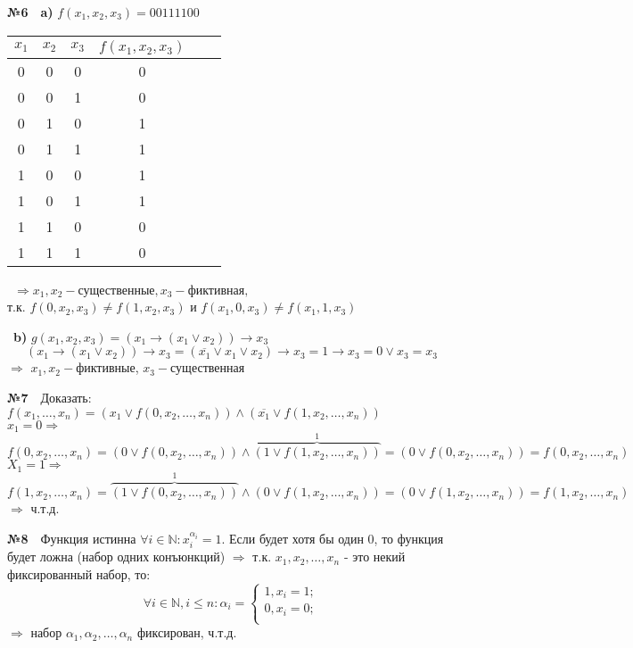\documentclass[a4paper, 12pt]{article}
\begin{document}
	\textbf{№6}\
	\
	\textbf{a)} $f(x_1,x_2, x_3) = 00111100$
	\begin{table}[H]
	\centering	
	\begin{tabular}{|c|c|c|c|c|c|}
		\hline
		$x_1$ & $x_2$ & $x_3$ & $f(x_1,x_2, x_3)$ \\ \hline
		0 & 0 & 0 & 0 \\ \hline
		0 & 0 & 1 & 0 \\ \hline
		0 & 1 & 0 & 1 \\ \hline
		0 & 1 & 1 & 1 \\ \hline	
		1 & 0 & 0 & 1 \\ \hline
		1 & 0 & 1 & 1 \\ \hline
		1 & 1 & 0 & 0 \\ \hline
		1 & 1 & 1 & 0 \\ \hline
	\end{tabular}
	\
	$\Rightarrow x_1, x_2 - \text{существенные}, x_3 - \text{фиктивная,}$
	\\
	т.к. $f(0, x_2, x_3) \not= f(1, x_2, x_3)$ и $f(x_1, 0, x_3) \not= f(x_1, 1, x_3)$
	\end{table}
	\
	\textbf{b)} $g(x_1, x_2, x_3) = (x_1 \rightarrow (x_1 \vee x_2)) \rightarrow x_3$
	\[
		(x_1 \rightarrow (x_1 \vee x_2)) \rightarrow x_3 = (\overline{x_1} \vee x_1 \vee x_2) \rightarrow x_3 = 1 \rightarrow x_3 = 0 \vee x_3 = x_3
	\]
	$\Rightarrow$ $x_1, x_2 - \text{фиктивные}$, $x_3 - \text{существенная}$ 
	
	\textbf{№7}\
	\
	Доказать: $f(x_1, \dots, x_n) = (x_1 \vee f(0, x_2, \dots, x_n)) \wedge (\overline{x_1} \vee f(1, x_2, \dots, x_n))$
	\\
	$x_1 = 0 \Rightarrow$
	\[
		f(0, x_2, \dots, x_n) = (0 \vee f(0, x_2, \dots, x_n)) \wedge \overbrace{(1 \vee f(1, x_2, \dots, x_n))}^{1} = (0 \vee f(0, x_2, \dots, x_n)) = f(0, x_2, \dots, x_n)
	\]
	$X_1 = 1 \Rightarrow$
	\[
		f(1, x_2, \dots, x_n) = \overbrace{(1 \vee f(0, x_2, \dots, x_n))}^{1} \wedge (0 \vee f(1, x_2, \dots, x_n)) = (0 \vee f(1, x_2, \dots, x_n)) = f(1, x_2, \dots, x_n)	
	\]
	$\Rightarrow$ ч.т.д.
	
	\textbf{№8}\
	\
	Функция истинна $\forall i \in \mathbb{N}: x_{i}^{\alpha_i} = 1$. Если будет хотя бы один 0, то функция будет ложна (набор одних конъюнкций) $\Rightarrow$ т.к. $x_1, x_2, \dots, x_n$ - это некий фиксированный набор, то:
	\[
		\forall i \in \mathbb{N}, i \leq n: \alpha_i =
		\left\{
			\begin{gathered}
			1, x_i = 1; \\
			0, x_i = 0; \\
			\end{gathered}
		\right. 
	\]
	$\Rightarrow$ набор $\alpha_1, \alpha_2, \dots, \alpha_n$ фиксирован, ч.т.д. 
	
	
			
\end{document}
